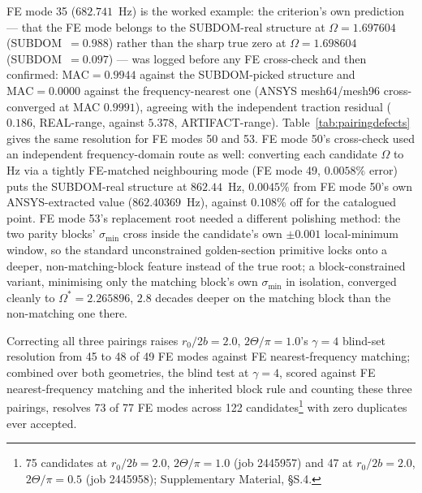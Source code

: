 \documentclass[11pt]{article}
\begin{document}
FE mode 35 ($682.741$~Hz) is the worked example: the criterion's own
prediction --- that the FE mode belongs to the SUBDOM-real structure at
$\Omega=1.697604$ (SUBDOM~$=0.988$) rather than the sharp true zero at
$\Omega=1.698604$ (SUBDOM~$=0.097$) --- was logged before any FE
cross-check and then confirmed: $\mathrm{MAC}=0.9944$ against the
SUBDOM-picked structure and $\mathrm{MAC}=0.0000$ against the
frequency-nearest one (ANSYS mesh64/mesh96 cross-converged at MAC
$0.9991$), agreeing with the independent traction residual ($0.186$,
REAL-range, against $5.378$, ARTIFACT-range). Table~\ref{tab:pairingdefects}
gives the same resolution for FE modes 50 and 53. FE mode 50's cross-check
used an independent frequency-domain route as well: converting each
candidate $\Omega$ to Hz via a tightly FE-matched neighbouring mode (FE
mode 49, $0.0058\%$ error) puts the SUBDOM-real structure at $862.44$~Hz,
$0.0045\%$ from FE mode 50's own ANSYS-extracted value ($862.40369$~Hz),
against $0.108\%$ off for the catalogued point. FE mode 53's replacement
root needed a different polishing method: the two parity blocks'
$\sigma_{\min}$ cross inside the candidate's own $\pm0.001$
local-minimum window, so the standard unconstrained golden-section
primitive locks onto a deeper, non-matching-block feature instead of the
true root; a block-constrained variant, minimising only the matching
block's own $\sigma_{\min}$ in isolation, converged cleanly to
$\Omega^{*}=2.265896$, $2.8$ decades deeper on the matching block than
the non-matching one there.

Correcting all three pairings raises $r_0/2b=2.0$, $2\Theta/\pi=1.0$'s
$\gamma=4$ blind-set resolution from 45 to 48 of 49 FE modes against FE
nearest-frequency matching; combined over both geometries, the blind test
at $\gamma=4$, scored against FE nearest-frequency matching and the inherited
block rule and counting these three pairings, resolves 73 of 77 FE modes
across 122 candidates\footnote{75 candidates at $r_0/2b=2.0$, $2\Theta/\pi=1.0$ (job 2445957) and 47 at $r_0/2b=2.0$, $2\Theta/\pi=0.5$ (job 2445958); Supplementary Material, \S S.4.} with zero duplicates ever accepted.
\end{document}
